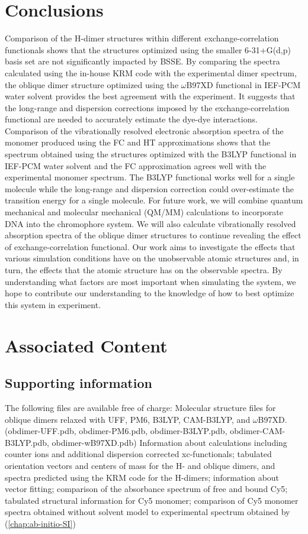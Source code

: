 \section{Conclusions}

Comparison of the H-dimer structures within different exchange-correlation functionals shows that the structures optimized using the smaller 6-31+G(d,p) basis set are not significantly impacted by BSSE. By comparing the spectra calculated using the in-house KRM code with the experimental dimer spectrum, the oblique dimer structure optimized using the $\omega$B97XD functional in IEF-PCM water solvent provides the best agreement with the experiment. It suggests that the long-range and dispersion corrections imposed by the exchange-correlation functional are needed to accurately estimate the dye-dye interactions. Comparison of the vibrationally resolved electronic absorption spectra of the monomer produced using the FC and HT approximations shows that the spectrum obtained using the structures optimized with the B3LYP functional in IEF-PCM water solvent and the FC approximation agrees well with the experimental monomer spectrum. The B3LYP functional works well for a single molecule while the long-range and dispersion correction could over-estimate the transition energy for a single molecule. For future work, we will combine quantum mechanical and molecular mechanical (QM/MM) calculations to incorporate DNA into the chromophore system. We will also calculate vibrationally resolved absorption spectra of the oblique dimer structures to continue revealing the effect of exchange-correlation functional. Our work aims to investigate the effects that various simulation conditions have on the unobservable atomic structures and, in turn, the effects that the atomic structure has on the observable spectra. By understanding what factors are most important when simulating the system, we hope to contribute our understanding to the knowledge of how to best optimize this system in experiment.

\section{Associated Content}
\subsection{Supporting information}
The following files are available free of charge:
Molecular structure files for oblique dimers relaxed with UFF, PM6, B3LYP, CAM-B3LYP, and $\omega$B97XD. (obdimer-UFF.pdb, obdimer-PM6.pdb, obdimer-B3LYP.pdb, obdimer-CAM-B3LYP.pdb, obdimer-wB97XD.pdb)
Information about calculations including counter ions and additional dispersion corrected xc-functionals; tabulated orientation vectors and centers of mass for the H- and oblique dimers, and spectra predicted using the KRM code for the H-dimers; information about vector fitting; comparison of the absorbance spectrum of free and bound Cy5; tabulated structural information for Cy5 monomer; comparison of Cy5 monomer spectra obtained without solvent model to experimental spectrum obtained by \cite{Cannon2017} (\autoref{chap:ab-initio-SI})

